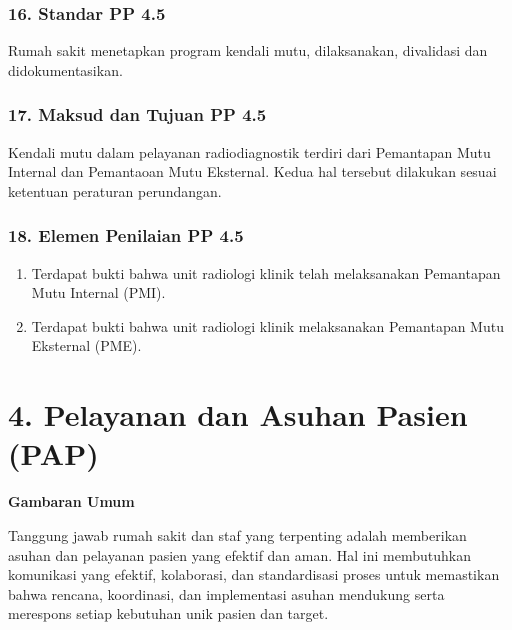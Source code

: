 \documentclass[
]{book}
\providecommand{\tightlist}{%
  \setlength{\itemsep}{0pt}\setlength{\parskip}{0pt}}
\begin{document}
\hypertarget{standar-pp-4.5}{%
\subsubsection*{16. Standar PP 4.5}\label{standar-pp-4.5}}

Rumah sakit menetapkan program kendali mutu, dilaksanakan, divalidasi dan didokumentasikan.

\hypertarget{maksud-dan-tujuan-pp-4.5}{%
\subsubsection*{17. Maksud dan Tujuan PP 4.5}\label{maksud-dan-tujuan-pp-4.5}}

Kendali mutu dalam pelayanan radiodiagnostik terdiri dari Pemantapan Mutu Internal dan Pemantaoan Mutu Eksternal. Kedua hal tersebut dilakukan sesuai ketentuan peraturan perundangan.

\hypertarget{elemen-penilaian-pp-4.5}{%
\subsubsection*{18. Elemen Penilaian PP 4.5}\label{elemen-penilaian-pp-4.5}}

\begin{enumerate}
\def\labelenumi{\alph{enumi}.}
\tightlist
\item
  Terdapat bukti bahwa unit radiologi klinik telah melaksanakan Pemantapan Mutu Internal (PMI).
\item
  Terdapat bukti bahwa unit radiologi klinik melaksanakan Pemantapan Mutu Eksternal (PME).
\end{enumerate}

\hypertarget{pelayanan-dan-asuhan-pasien-pap}{%
\section*{4. Pelayanan dan Asuhan Pasien (PAP)}\label{pelayanan-dan-asuhan-pasien-pap}}

\textbf{Gambaran Umum}

Tanggung jawab rumah sakit dan staf yang terpenting adalah memberikan asuhan dan pelayanan pasien yang efektif dan aman. Hal ini membutuhkan komunikasi yang efektif, kolaborasi, dan standardisasi proses untuk memastikan bahwa rencana, koordinasi, dan implementasi asuhan mendukung serta merespons setiap kebutuhan unik pasien dan target.
\end{document}
